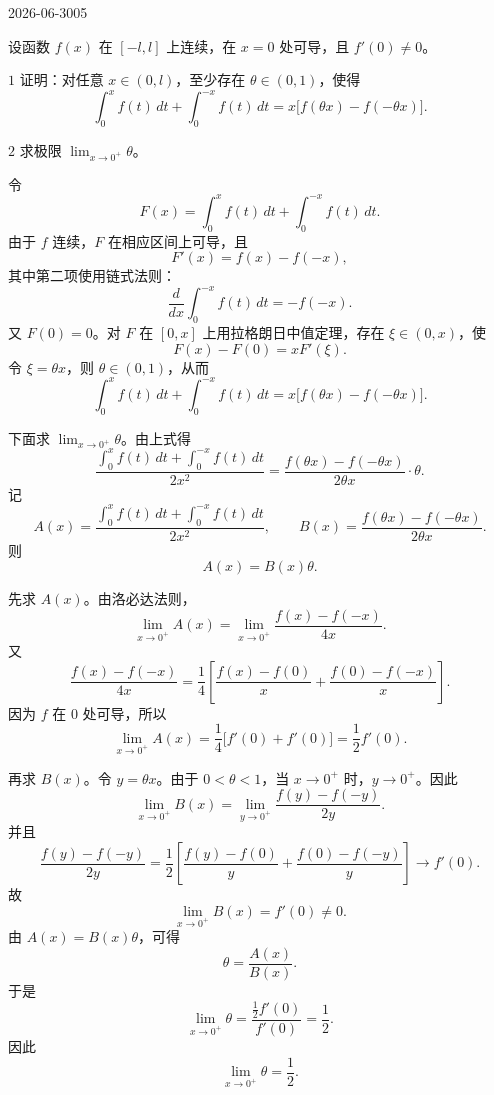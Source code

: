 \begin{mistake}{2026-06-30}{05}

\begin{problemcontent}
设函数 \(f(x)\) 在 \([-l,l]\) 上连续，在 \(x=0\) 处可导，且 \(f'(0)\ne 0\)。

\(1\) 证明：对任意 \(x\in(0,l)\)，至少存在 \(\theta\in(0,1)\)，使得
\[
\int_0^x f(t)\,dt+\int_0^{-x}f(t)\,dt
=x\bigl[f(\theta x)-f(-\theta x)\bigr].
\]

\(2\) 求极限 \(\displaystyle \lim_{x\to0^+}\theta\)。
\end{problemcontent}

\begin{solutioncontent}
令
\[
F(x)=\int_0^x f(t)\,dt+\int_0^{-x}f(t)\,dt.
\]
由于 \(f\) 连续，\(F\) 在相应区间上可导，且
\[
F'(x)=f(x)-f(-x),
\]
其中第二项使用链式法则：
\[
\frac{d}{dx}\int_0^{-x}f(t)\,dt=-f(-x).
\]
又 \(F(0)=0\)。对 \(F\) 在 \([0,x]\) 上用拉格朗日中值定理，存在 \(\xi\in(0,x)\)，使
\[
F(x)-F(0)=xF'(\xi).
\]
令 \(\xi=\theta x\)，则 \(\theta\in(0,1)\)，从而
\[
\int_0^x f(t)\,dt+\int_0^{-x}f(t)\,dt
=x\bigl[f(\theta x)-f(-\theta x)\bigr].
\]

下面求 \(\lim_{x\to0^+}\theta\)。由上式得
\[
\frac{\int_0^x f(t)\,dt+\int_0^{-x}f(t)\,dt}{2x^2}
=
\frac{f(\theta x)-f(-\theta x)}{2\theta x}\cdot \theta.
\]
记
\[
A(x)=\frac{\int_0^x f(t)\,dt+\int_0^{-x}f(t)\,dt}{2x^2},
\qquad
B(x)=\frac{f(\theta x)-f(-\theta x)}{2\theta x}.
\]
则
\[
A(x)=B(x)\theta.
\]

先求 \(A(x)\)。由洛必达法则，
\[
\lim_{x\to0^+}A(x)
=
\lim_{x\to0^+}\frac{f(x)-f(-x)}{4x}.
\]
又
\[
\frac{f(x)-f(-x)}{4x}
=\frac14\left[\frac{f(x)-f(0)}{x}+\frac{f(0)-f(-x)}{x}\right].
\]
因为 \(f\) 在 \(0\) 处可导，所以
\[
\lim_{x\to0^+}A(x)=\frac14\bigl[f'(0)+f'(0)\bigr]=\frac12f'(0).
\]

再求 \(B(x)\)。令 \(y=\theta x\)。由于 \(0<\theta<1\)，当 \(x\to0^+\) 时，\(y\to0^+\)。因此
\[
\lim_{x\to0^+}B(x)
=
\lim_{y\to0^+}\frac{f(y)-f(-y)}{2y}.
\]
并且
\[
\frac{f(y)-f(-y)}{2y}
=\frac12\left[\frac{f(y)-f(0)}{y}+\frac{f(0)-f(-y)}{y}\right]
\to f'(0).
\]
故
\[
\lim_{x\to0^+}B(x)=f'(0)\ne0.
\]
由 \(A(x)=B(x)\theta\)，可得
\[
\theta=\frac{A(x)}{B(x)}.
\]
于是
\[
\lim_{x\to0^+}\theta
=\frac{\frac12f'(0)}{f'(0)}
=\frac12.
\]
因此
\[
\boxed{\lim_{x\to0^+}\theta=\frac12}.
\]
\end{solutioncontent}


\end{mistake}
